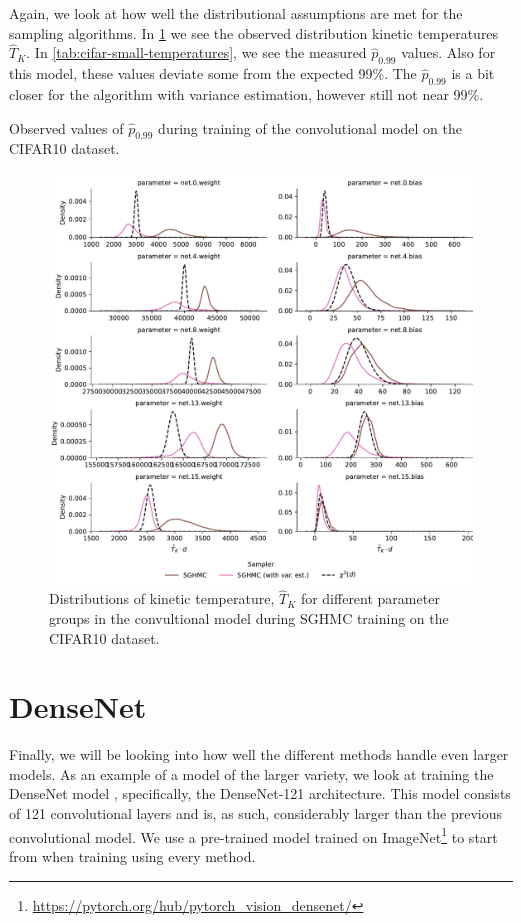 Again, we look at how well the distributional assumptions are met for the sampling algorithms.
In \cref{fig:cifar-small-temperatures} we see the observed distribution kinetic temperatures $\hat{T}_K$. 
In \cref{tab:cifar-small-temperatures}, we see the measured $\hat p_{0.99}$ values.
Also for this model, these values deviate some from the expected 99\%.
The $\hat p_{0.99}$ is a bit closer for the algorithm with variance estimation, however still not near 99\%.
\begin{table}[htbp]
    \centering
    
    \caption{Observed values of $\hat{p}_{0.99}$ during training of the convolutional model on the CIFAR10 dataset.}
    \label{tab:cifar-small-temperatures}
\end{table}
\begin{figure}[htbp]
    \centering
    \includegraphics[width=\linewidth]{Figures/cifar-small-temperatures.pdf}
    \caption{Distributions of kinetic temperature, $\hat{T}_K$ for different parameter groups in the convultional model during SGHMC training on the CIFAR10 dataset.}
    \label{fig:cifar-small-temperatures}
\end{figure}

\FloatBarrier
\section{DenseNet}
Finally, we will be looking into how well the different methods handle even larger models.
As an example of a model of the larger variety, we look at training the DenseNet model \autocite{huang_densely_2017}, specifically, the DenseNet-121 architecture. 
This model consists of 121 convolutional layers and is, as such, considerably larger than the previous convolutional model. 
We use a pre-trained model trained on ImageNet\footnote{\url{https://pytorch.org/hub/pytorch_vision_densenet/}} to start from when training using every method.

